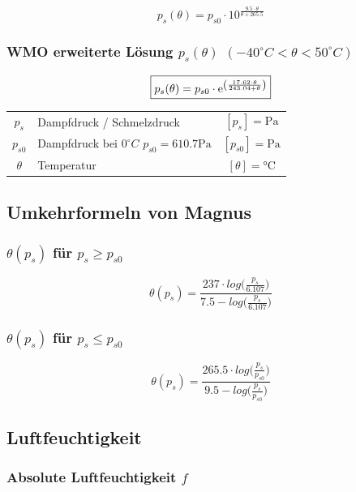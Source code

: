 $$ \boxed{ p_s(\theta) = p_{s0} \cdot 10^{ \frac{9.5 \cdot \theta}{\theta + 265.5} } } $$


\subsubsection{WMO erweiterte Lösung $p_s(\theta)$ $ (-40^{\circ}C < \theta < 50^{\circ}C) $}

$$ \boxed{p_s(\theta) = p_{s0} \cdot \mathrm{e} ^{\left( \frac{17.62 \cdot \theta}{243.04 + \theta} \right)} }$$



\begin{tabular}{c l c}
	$p_s$ & Dampfdruck / Schmelzdruck & $[p_s] = \mathrm{Pa}$ \\
	$p_{s0}$ & Dampfdruck bei $0^{\circ}C$ \quad $p_{s0} = 610.7 \mathrm{Pa} $ & $[p_{s0}] = \mathrm{Pa}$ \\
	$\theta$ & Temperatur & $[\theta] = \text{°C}$ \\
	
\end{tabular}




\subsection{Umkehrformeln von Magnus}

\subsubsection{$\theta(p_s)$ für $p_s \geq p_{s0}$}


$$ \boxed{ \theta(p_s) = \frac{237 \cdot log \big( \frac{p_s}{6.107} \big)  }{7.5 - log \big( \frac{p_s}{6.107} \big)} } $$



\subsubsection{$\theta(p_s)$ für $p_s \leq p_{s0}$}

$$ \boxed{ \theta(p_s) = \frac{265.5 \cdot log \big( \frac{p_s}{p_{s0}} \big)  }{9.5 - log \big( \frac{p_s}{p_{s0}} \big)} } $$




\subsection{Luftfeuchtigkeit}

\subsubsection{Absolute Luftfeuchtigkeit  $f$}

